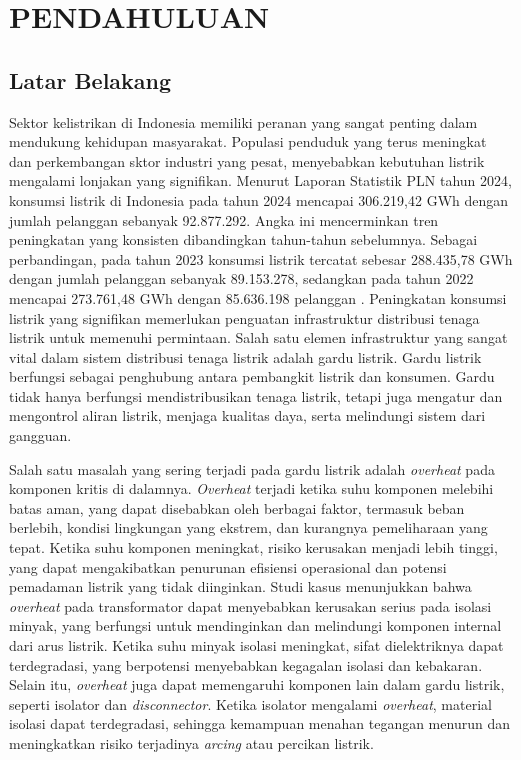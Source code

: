 \chapter{PENDAHULUAN}
\label{chap:pendahuluan}

\section{Latar Belakang}
\label{sec:latarbelakang}
\sloppy
Sektor kelistrikan di Indonesia memiliki peranan yang sangat penting dalam mendukung kehidupan masyarakat. Populasi penduduk yang terus meningkat dan perkembangan sktor industri yang pesat, menyebabkan kebutuhan listrik mengalami lonjakan yang signifikan. Menurut Laporan Statistik PLN tahun 2024, konsumsi listrik di Indonesia pada tahun 2024 mencapai 306.219,42 GWh dengan jumlah pelanggan sebanyak 92.877.292. Angka ini mencerminkan tren peningkatan yang konsisten dibandingkan tahun-tahun sebelumnya. Sebagai perbandingan, pada tahun 2023 konsumsi listrik tercatat sebesar 288.435,78 GWh dengan jumlah pelanggan sebanyak 89.153.278, sedangkan pada tahun 2022 mencapai 273.761,48 GWh dengan 85.636.198 pelanggan \cite{PLN2024}. Peningkatan konsumsi listrik yang signifikan memerlukan penguatan infrastruktur distribusi tenaga listrik untuk  memenuhi permintaan. Salah satu elemen infrastruktur yang sangat vital dalam sistem distribusi tenaga listrik adalah gardu listrik. Gardu listrik berfungsi sebagai penghubung antara pembangkit listrik dan konsumen. Gardu tidak hanya berfungsi mendistribusikan tenaga listrik, tetapi juga mengatur dan mengontrol aliran listrik, menjaga kualitas daya, serta melindungi sistem dari gangguan.


Salah satu masalah yang sering terjadi pada gardu listrik adalah \emph{overheat} pada komponen kritis di dalamnya. \emph{Overheat} terjadi ketika suhu komponen melebihi batas aman, yang dapat disebabkan oleh berbagai faktor, termasuk beban berlebih, kondisi lingkungan yang ekstrem, dan kurangnya pemeliharaan yang tepat\cite{Bailey2022}. Ketika suhu komponen meningkat, risiko kerusakan menjadi lebih tinggi, yang dapat mengakibatkan penurunan efisiensi operasional dan potensi pemadaman listrik yang tidak diinginkan\cite{Aksenovich2022}. Studi kasus menunjukkan bahwa \emph{overheat} pada transformator dapat menyebabkan kerusakan serius pada isolasi minyak, yang berfungsi untuk mendinginkan dan melindungi komponen internal dari arus listrik. Ketika suhu minyak isolasi meningkat, sifat dielektriknya dapat terdegradasi, yang berpotensi menyebabkan kegagalan isolasi dan kebakaran\cite{Kalathiripi2017}. Selain itu, \emph{overheat} juga dapat memengaruhi komponen lain dalam gardu listrik, seperti isolator dan \emph{disconnector}. Ketika isolator mengalami \emph{overheat}, material isolasi dapat terdegradasi, sehingga kemampuan menahan tegangan menurun dan meningkatkan risiko terjadinya \emph{arcing} atau percikan listrik\cite{Li2017}.

